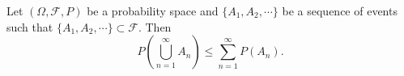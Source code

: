 \documentclass[12pt]{article}
\begin{document}
Let $(\Omega,\mathcal{F},P)$ be a probability space and $\{A_1, A_2,\cdots \}$ be a sequence of events 
such that  $\{A_1, A_2,\cdots \} \subset \mathcal{F} $. Then
 $$P(\bigcup_{n=1}^\infty A_n)\leq \sum_{n=1}^{\infty}P(A_n).$$
\end{document}
